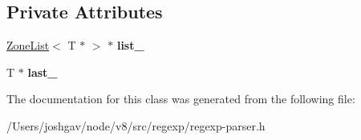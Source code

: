 \subsection*{Private Attributes}
\begin{DoxyCompactItemize}
\item 
\hyperlink{classv8_1_1internal_1_1_zone_list}{Zone\+List}$<$ T $\ast$ $>$ $\ast$ {\bfseries list\+\_\+}\hypertarget{classv8_1_1internal_1_1_buffered_zone_list_ae21a6f27982bcf560612175aace62ff6}{}\label{classv8_1_1internal_1_1_buffered_zone_list_ae21a6f27982bcf560612175aace62ff6}

\item 
T $\ast$ {\bfseries last\+\_\+}\hypertarget{classv8_1_1internal_1_1_buffered_zone_list_a9cb085b9f23e6df06abb350388d3c24c}{}\label{classv8_1_1internal_1_1_buffered_zone_list_a9cb085b9f23e6df06abb350388d3c24c}

\end{DoxyCompactItemize}


The documentation for this class was generated from the following file\+:\begin{DoxyCompactItemize}
\item 
/\+Users/joshgav/node/v8/src/regexp/regexp-\/parser.\+h\end{DoxyCompactItemize}
